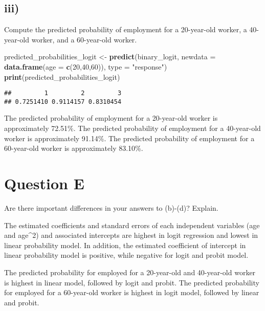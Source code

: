 \documentclass[
]{article}
\newenvironment{Shaded}{\begin{snugshade}}{\end{snugshade}}
\newcommand{\AttributeTok}[1]{\textcolor[rgb]{0.13,0.29,0.53}{#1}}
\newcommand{\DecValTok}[1]{\textcolor[rgb]{0.00,0.00,0.81}{#1}}
\newcommand{\FunctionTok}[1]{\textcolor[rgb]{0.13,0.29,0.53}{\textbf{#1}}}
\newcommand{\NormalTok}[1]{#1}
\newcommand{\OtherTok}[1]{\textcolor[rgb]{0.56,0.35,0.01}{#1}}
\newcommand{\StringTok}[1]{\textcolor[rgb]{0.31,0.60,0.02}{#1}}
\begin{document}
\hypertarget{iii-2}{%
\subsection{iii)}\label{iii-2}}

Compute the predicted probability of employment for a 20-year-old
worker, a 40-year-old worker, and a 60-year-old worker.

\begin{Shaded}
\begin{Highlighting}[]
\NormalTok{predicted\_probabilities\_logit }\OtherTok{\textless{}{-}} \FunctionTok{predict}\NormalTok{(binary\_logit, }
                                         \AttributeTok{newdata =} \FunctionTok{data.frame}\NormalTok{(}\AttributeTok{age =} \FunctionTok{c}\NormalTok{(}\DecValTok{20}\NormalTok{,}\DecValTok{40}\NormalTok{,}\DecValTok{60}\NormalTok{)), }
                                         \AttributeTok{type =} \StringTok{"response"}\NormalTok{)}
\FunctionTok{print}\NormalTok{(predicted\_probabilities\_logit)}
\end{Highlighting}
\end{Shaded}

\begin{verbatim}
##         1         2         3 
## 0.7251410 0.9114157 0.8310454
\end{verbatim}

The predicted probability of employment for a 20-year-old worker is
approximately 72.51\%. The predicted probability of employment for a
40-year-old worker is approximately 91.14\%. The predicted probability
of employment for a 60-year-old worker is approximately 83.10\%.

\hypertarget{question-e}{%
\section{Question E}\label{question-e}}

Are there important differences in your answers to (b)-(d)? Explain.

\vspace{1em}

The estimated coefficients and standard errors of each independent
variables (age and age\^{}2) and associated intercepts are highest in
logit regression and lowest in linear probability model. In addition,
the estimated coefficient of intercept in linear probability model is
positive, while negative for logit and probit model.

The predicted probability for employed for a 20-year-old and 40-year-old
worker is highest in linear model, followed by logit and probit. The
predicted probability for employed for a 60-year-old worker is highest
in logit model, followed by linear and probit.
\end{document}

